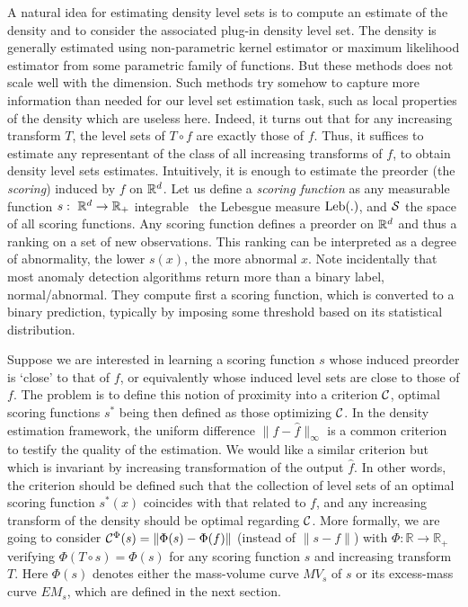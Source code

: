 



A natural idea for estimating density level sets is to compute an estimate of the density and to consider the associated plug-in density level set.
The density is generally estimated using non-parametric kernel estimator or maximum likelihood estimator from some parametric family of functions. But these methods does not scale well with the dimension. Such methods try somehow to capture more information than needed for our level set estimation task, such as local properties of the density which are useless here. Indeed, it turns out that for any increasing transform $T$, the level sets of $T\circ f$ are exactly those of $f$. Thus, it suffices to estimate any representant of the class of all increasing transforms of $f$, to obtain density level sets estimates. Intuitively, it is enough to estimate the preorder (the \emph{scoring}) induced by $f$ on $\rset^d$. Let us define a \emph{scoring function} as any measurable function $s:~\rset^d \to \rset_+$ integrable \wrt~the Lebesgue measure $\leb(.)$, and $\S$ the space of all scoring functions.
Any scoring function defines a preorder on $\rset^d$ and thus a ranking on a set of new observations. This ranking can be interpreted as a degree of abnormality, the lower $s(x)$, the more abnormal $x$. Note incidentally that most anomaly detection algorithms return more than a binary label, normal/abnormal. They compute first a scoring function, which is converted to a binary prediction, typically by imposing some threshold based on its statistical distribution.

Suppose we are interested in learning a scoring function $s$ whose induced preorder is `close' to that of $f$, or equivalently whose induced level sets are close to those of $f$. The problem is to define this notion of proximity into a criterion $\crit$, optimal scoring functions $s^*$ being then defined as those optimizing $\crit$. In the density estimation framework, the uniform difference $\|f - \hat f\|_\infty$ is a common criterion to testify the quality of the estimation. We would like a similar criterion but which is invariant by increasing transformation of the output $\hat f$. In other words, the criterion should be defined such that the collection of level sets of an optimal scoring function $s^*(x)$ coincides with that related to $f$, and any increasing transform of the density should be optimal regarding $\crit$.
More formally, we are going to consider $\crit^{\Phi}(s) = \| \Phi(s) - \Phi(f) \|$ (instead of $\|s - f\|$) %
with $\Phi: \mathbb{R} \to \mathbb{R}_+$ verifying $\Phi(T \circ s) = \Phi(s)$ 
for any scoring function $s$ and increasing transform $T$. Here $\Phi(s)$ denotes either the mass-volume curve $MV_s$ of $s$ or its excess-mass curve $EM_s$, which are defined in the next section.  



